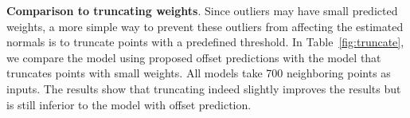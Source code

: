 \textbf{Comparison to truncating weights}. Since outliers may have small predicted weights, a more simple way to prevent these outliers from affecting the estimated normals is to truncate points with a predefined threshold. In Table~\ref{fig:truncate}, we compare the model using proposed offset predictions with the model that truncates points with small weights. All models take 700 neighboring points as inputs. The results show that truncating indeed slightly improves the results but is still inferior to the model with offset prediction.